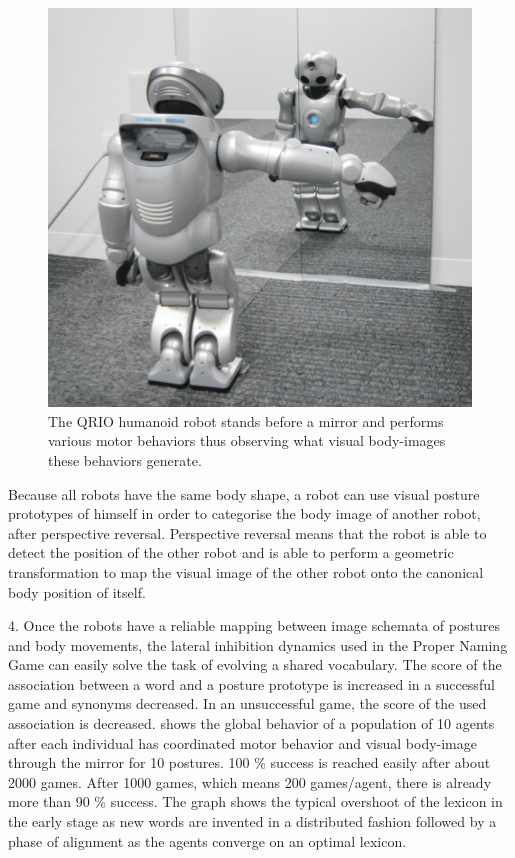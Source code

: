 \begin{figure}
\centerline{\includegraphics[width=0.6\linewidth]{chap11/figs/robot-mirror}}
\caption{\label{robot-mirror} \footnotesize{The QRIO humanoid robot stands before a mirror and performs various motor behaviors thus observing what visual body-images these behaviors generate.}}
\end{figure}

Because all robots have the same body shape, a robot can use visual posture prototypes of 
himself in order to categorise the body image of another robot, after 
perspective reversal. Perspective reversal means that the robot is able to detect the position of the other 
robot and is able to perform a geometric transformation to map the visual image of the other robot onto 
the canonical body position of itself.

4. Once the robots have a reliable mapping between image schemata of postures and body movements, the 
lateral inhibition dynamics used in the Proper Naming Game can easily solve the task of evolving 
a shared vocabulary. The score of the association between a word and a posture prototype is increased in a successful 
game and synonyms decreased. In an unsuccessful game, the score of the used association is decreased. 
shows the global behavior of a population of 10 agents after each individual has coordinated motor 
behavior and visual body-image through the mirror for 10 postures. 100 \% success is reached easily after about 
2000 games. After 1000 games, which means 200 games/agent, there is already more than 90 \% success. 
The graph shows the typical overshoot of the lexicon in the early stage 
as new words are invented in a distributed fashion followed by a phase 
of alignment as the agents converge on an optimal lexicon. 



